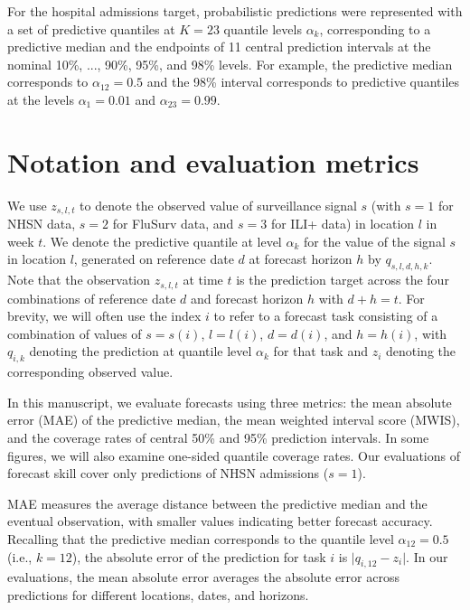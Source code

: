 \documentclass{article}\usepackage[]{graphicx}\usepackage[]{xcolor}
\begin{document}
For the hospital admissions target, probabilistic predictions were represented with a set of predictive quantiles at $K = 23$ quantile levels $\alpha_k$, corresponding to a predictive median and the endpoints of 11 central prediction intervals at the nominal 10\%, ..., 90\%, 95\%, and 98\% levels. For example, the predictive median corresponds to $\alpha_{12} = 0.5$ and the 98\% interval corresponds to predictive quantiles at the levels $\alpha_1 = 0.01$ and $\alpha_{23} = 0.99$.

\section{Notation and evaluation metrics}
\label{sec:notation}

We use $z_{s, l, t}$ to denote the observed value of surveillance signal $s$ (with $s = 1$ for NHSN data, $s = 2$ for FluSurv data, and $s = 3$ for ILI+ data) in location $l$ in week $t$.  We denote the predictive quantile at level $\alpha_k$ for the value of the signal $s$ in location $l$, generated on reference date $d$ at forecast horizon $h$ by $q_{s,l,d,h,k}$.  Note that the observation $z_{s, l, t}$ at time $t$ is the prediction target across the four combinations of reference date $d$ and forecast horizon $h$ with $d + h = t$.  For brevity, we will often use the index $i$ to refer to a forecast task consisting of a combination of values of $s = s(i)$, $l = l(i)$, $d = d(i)$, and $h = h(i)$, with $q_{i,k}$ denoting the prediction at quantile level $\alpha_k$ for that task and $z_i$ denoting the corresponding observed value.

In this manuscript, we evaluate forecasts using three metrics: the mean absolute error (MAE) of the predictive median, the mean weighted interval score (MWIS), and the coverage rates of central 50\% and 95\% prediction intervals. In some figures, we will also examine one-sided quantile coverage rates. Our evaluations of forecast skill cover only predictions of NHSN admissions ($s = 1$).

MAE measures the average distance between the predictive median and the eventual observation, with smaller values indicating better forecast accuracy.  Recalling that the predictive median corresponds to the quantile level $\alpha_{12} = 0.5$ (i.e., $k = 12$), the absolute error of the prediction for task $i$ is $\vert q_{i, 12} - z_{i} \vert$.  In our evaluations, the mean absolute error averages the absolute error across predictions for different locations, dates, and horizons.
\end{document}
